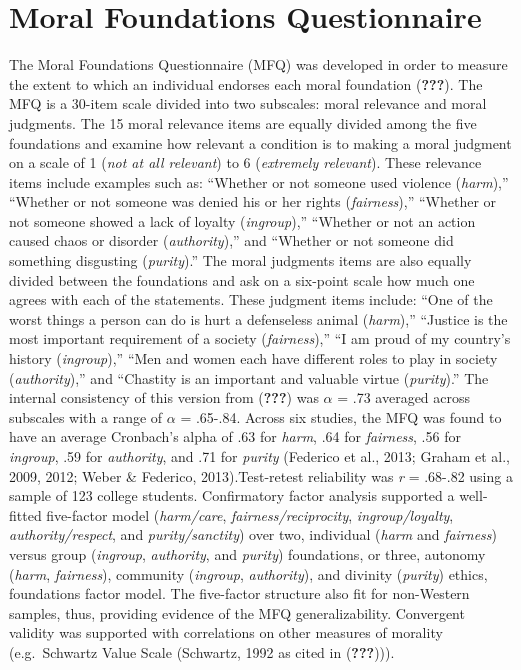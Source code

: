 \documentclass[english,man]{apa6}
\newcounter{author}
\theoremstyle{definition}
\theoremstyle{definition}
\theoremstyle{definition}
\theoremstyle{remark}
\begin{document}
\section{Moral Foundations
Questionnaire}\label{moral-foundations-questionnaire}

The Moral Foundations Questionnaire (MFQ) was developed in order to
measure the extent to which an individual endorses each moral foundation
({\textbf{???}}). The MFQ is a 30-item scale divided into two subscales:
moral relevance and moral judgments. The 15 moral relevance items are
equally divided among the five foundations and examine how relevant a
condition is to making a moral judgment on a scale of 1 (\emph{not at
all relevant}) to 6 (\emph{extremely relevant}). These relevance items
include examples such as: \enquote{Whether or not someone used violence
(\emph{harm}),} \enquote{Whether or not someone was denied his or her
rights (\emph{fairness}),} \enquote{Whether or not someone showed a lack
of loyalty (\emph{ingroup}),} \enquote{Whether or not an action caused
chaos or disorder (\emph{authority}),} and \enquote{Whether or not
someone did something disgusting (\emph{purity}).} The moral judgments
items are also equally divided between the foundations and ask on a
six-point scale how much one agrees with each of the statements. These
judgment items include: \enquote{One of the worst things a person can do
is hurt a defenseless animal (\emph{harm}),} \enquote{Justice is the
most important requirement of a society (\emph{fairness}),} \enquote{I
am proud of my country's history (\emph{ingroup}),} \enquote{Men and
women each have different roles to play in society (\emph{authority}),}
and \enquote{Chastity is an important and valuable virtue
(\emph{purity}).} The internal consistency of this version from
({\textbf{???}}) was \(\alpha\) = .73 averaged across subscales with a
range of \(\alpha\) = .65-.84. Across six studies, the MFQ was found to
have an average Cronbach's alpha of .63 for \emph{harm}, .64 for
\emph{fairness}, .56 for \emph{ingroup}, .59 for \emph{authority}, and
.71 for \emph{purity} (Federico et al., 2013; Graham et al., 2009, 2012;
Weber \& Federico, 2013).Test-retest reliability was \emph{r} = .68-.82
using a sample of 123 college students. Confirmatory factor analysis
supported a well-fitted five-factor model (\emph{harm/care},
\emph{fairness/reciprocity}, \emph{ingroup/loyalty},
\emph{authority/respect}, and \emph{purity/sanctity}) over two,
individual (\emph{harm} and \emph{fairness}) versus group
(\emph{ingroup}, \emph{authority}, and \emph{purity}) foundations, or
three, autonomy (\emph{harm}, \emph{fairness}), community
(\emph{ingroup}, \emph{authority}), and divinity (\emph{purity}) ethics,
foundations factor model. The five-factor structure also fit for
non-Western samples, thus, providing evidence of the MFQ
generalizability. Convergent validity was supported with correlations on
other measures of morality (e.g.~Schwartz Value Scale (Schwartz, 1992 as
cited in ({\textbf{???}}))).
\end{document}
